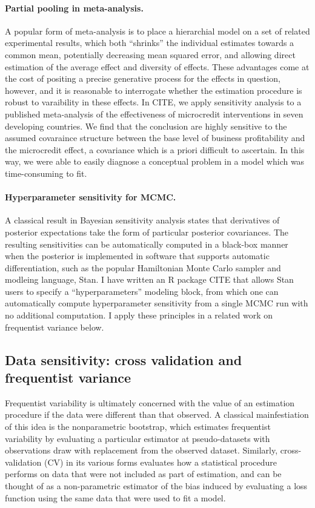 \paragraph{Partial pooling in meta-analysis.}

A popular form of meta-analysis is to place a hierarchial model on a set of
related experimental results, which both ``shrinks'' the individual estimates
towards a common mean, potentially decreasing mean squared error, and
allowing direct estimation of the average effect and diversity of effects.
These advantages come at the cost of positing a precise generative
process for the effects in question, however, and it is reasonable to
interrogate whether the estimation procedure is robust to varaibility
in these effects.  In CITE, we apply sensitivity analysis to a published
meta-analysis of the effectiveness of microcredit interventions in seven
developing countries.  We find that the conclusion are highly sensitive
to the assumed covaraince structure between the base level of business
profitability and the microcredit effect, a covariance which is a priori
difficult to ascertain.  In this way, we were able to easily diagnose
a conceptual problem in a model which was time-consuming to fit.


\paragraph{Hyperparameter sensitivity for MCMC.}

A classical result in Bayesian sensitivity analysis states that derivatives
of posterior expectations take the form of particular posterior covariances.
The resulting sensitivities can be automatically computed in a black-box
manner when the posterior is implemented in software that supports
automatic differentiation, such as the popular Hamiltonian Monte Carlo
sampler and modleing language, Stan.  I have written an R package CITE
that allows Stan users to specify a ``hyperparameters'' modeling block,
from which one can automatically compute hyperparameter sensitivity from
a single MCMC run with no additional computation.  I apply these principles
in a related work on frequentist variance below.


\subsection{Data sensitivity: cross validation and frequentist variance}

Frequentist variability is ultimately concerned with the value of an
estimation procedure if the data were different than that observed.  A classical
mainfestiation of this idea is the nonparametric bootstrap, which estimates
frequentist variability by evaluating a particular estimator at pseudo-datasets
with observations draw with replacement from the observed dataset.  Similarly,
cross-validation (CV) in its various forms evaluates how a statistical procedure
performs on data that were not included as part of estimation, and can be
thought of as a non-parametric estimator of the bias induced by evaluating
a loss function using the same data that were used to fit a model.

